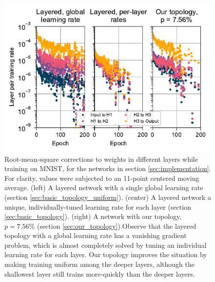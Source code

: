 \documentclass[utf8]{frontiersSCNS}
\begin{document}
\begin{figure}[h!]
\begin{center}
\includegraphics[width=\textwidth]{figures/MNIST_individual_layers.pdf}
\end{center}
\caption{Root-mean-square corrections to weights in different layers while training on MNIST, for the networks in section \ref{sec:implementation}. For clarity, values were subjected to an 11-point centered moving average. (left) A layered network with a single global learning rate (section \ref{sec:basic_topology_uniform}). (center) A layered network a unique, individually-tuned learning rate for each layer (section \ref{sec:basic_topology}).  (right) A network with our topology, $p = 7.56\%$ (section \ref{sec:our_topology}).Observe that the layered topology with a global learning rate has a vanishing gradient problem, which is almost completely solved by tuning an individual learning rate for each layer. Our topology improves the situation by making training uniform among the deeper layers, although the shallowest layer still trains more-quickly than the deeper layers.}   \label{fig:mnist_layers}
\end{figure}
\end{document}
